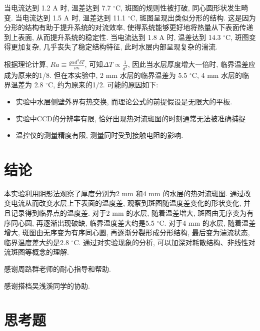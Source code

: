 \documentclass[font=default]{mpltx}
\begin{document}
  \par
  当电流达到 1.2 A 时, 温差达到 7.7 $^\circ$C, 斑图的规则性被打破, 同心圆形状发生畸变.
  当电流达到 1.5 A 时, 温差达到 11.1 $^\circ$C, 斑图呈现出类似分形的结构. 这是因为分形的结构有助于提升系统的对流效率, 使得系统能够更好地将热量从下表面传递到上表面, 从而提升系统的稳定性.
  当电流达到 1.8 A 时, 温差达到 14.3 $^\circ$C, 斑图变得更加复杂, 几乎丧失了稳定结构特征, 此时水层内部呈现复杂的湍流.

  \par
  根据理论计算, $Ra\equiv\frac{g\alpha d^3\delta T}{\nu\kappa}$, 可知$\Delta T \propto \frac{1}{d^3}$, 因此当水层厚度增大一倍时, 临界温差应成为原来的1/8.
  但在本实验中, 2 mm 水层的临界温差为 5.5 $^\circ$C, 4 mm 水层的临界温差为 2.8 $^\circ$C, 约为原来的1/2. 可能的原因如下:
  \begin{itemize}
    \item 实验中水层侧壁外界有热交换, 而理论公式的前提假设是无限大的平板.
    \item 实验中CCD的分辨率有限, 恰好出现热对流斑图的时刻通常无法被准确捕捉
    \item 温控仪的测量精度有限, 测量同时受到接触电阻的影响.
  \end{itemize}


\section{结论}
  本实验利用阴影法观察了厚度分别为2 mm 和4 mm 的水层的热对流斑图. 通过改变电流从而改变水层上下表面的温度差, 观察到斑图随温度差变化的形状变化, 并且记录得到临界点的温度差. 
  对于2 mm 的水层, 随着温差增大, 斑图由无序变为有序同心圆, 再逐渐出现破缺, 临界温度差大约是5.5 $^\circ$C.
  对于4 mm 的水层, 随着温差增大, 斑图由无序变为有序同心圆, 再逐渐分裂形成分形结构, 最后变为湍流状态, 临界温度差大约是2.8 $^\circ$C.
  通过对实验现象的分析, 可以加深对耗散结构、非线性对流斑图等概念的理解.

\begin{acknowledgments}
  感谢周路群老师的耐心指导和帮助.
  \par
  感谢搭档吴浅溪同学的协助.
\end{acknowledgments}



\clearpage %
\appendix %
\section{思考题}\label{app:exercise}
\end{document}
